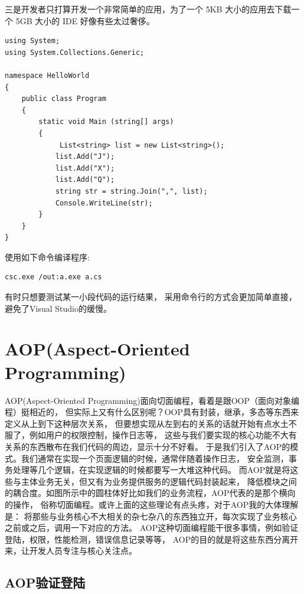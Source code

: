 \documentclass{book}
\begin{document}
三是开发者只打算开发一个非常简单的应用，为了一个 5KB 大小的应用去下载一个 5GB 大小的 IDE 好像有些太过奢侈。

\begin{lstlisting}[language={[Sharp]C}]
using System;
using System.Collections.Generic;

namespace HelloWorld
{
    public class Program
    {
        static void Main (string[] args)
        {
			 List<string> list = new List<string>();
            list.Add("J");
            list.Add("X");
            list.Add("Q");
            string str = string.Join(",", list);
            Console.WriteLine(str);
        }
    }
}
\end{lstlisting}

使用如下命令编译程序:

\begin{lstlisting}[language=Bash]
csc.exe /out:a.exe a.cs
\end{lstlisting}

有时只想要测试某一小段代码的运行结果，
采用命令行的方式会更加简单直接，
避免了Visual Studio的缓慢。

\section{AOP(Aspect-Oriented Programming)}

AOP(Aspect-Oriented Programming)面向切面编程，看着是跟OOP（面向对象编程）挺相近的，
但实际上又有什么区别呢？OOP具有封装，继承，多态等东西来定义从上到下这种层次关系，
但要想实现从左到右的关系的话就开始有点水土不服了，例如用户的权限控制，操作日志等，
这些与我们要实现的核心功能不大有关系的东西散布在我们代码的周边，显示十分不好看。
于是我们引入了AOP的模式。我们通常在实现一个页面逻辑的时候，通常伴随着操作日志，
安全监测，事务处理等几个逻辑，在实现逻辑的时候都要写一大堆这种代码。
而AOP就是将这些与主体业务无关，但又有为业务提供服务的逻辑代码封装起来，
降低模块之间的耦合度。如图所示中的圆柱体好比如我们的业务流程，AOP代表的是那个横向的操作，
俗称切面编程。或许上面的这些理论有点头疼，对于AOP我的大体理解是：
将那些与业务核心不大相关的杂七杂八的东西独立开，每次实现了业务核心之前或之后，调用一下对应的方法。
AOP这种切面编程能干很多事情，例如验证登陆，权限，性能检测，错误信息记录等等，
AOP的目的就是将这些东西分离开来，让开发人员专注与核心关注点。

\subsection{AOP验证登陆}
\end{document}
